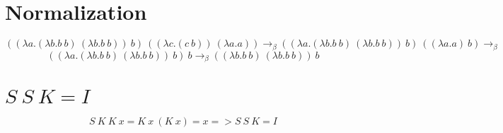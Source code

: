 \documentclass{article}
\begin{document}
\section{Normalization}

\large$$((\lambda a.(\lambda  b.b\ b)\ (\lambda b.b\ b))\ b)\ ((\lambda c.(c\ b))\ (\lambda a.a)) \rightarrow_\beta
((\lambda a.(\lambda  b.b\ b)\ (\lambda b.b\ b))\ b)\ ((\lambda a.a)\ b) \rightarrow_\beta$$
$$((\lambda a.(\lambda  b.b\ b)\ (\lambda b.b\ b))\ b)\ b \rightarrow_\beta
((\lambda  b.b\ b)\ (\lambda b.b\ b))\ b$$

\section{$S\ S\ K = I$}
$$S\ K\ K\ x = K\ x\ (K\ x) = x => S\ S\ K = I$$
\end{document}
